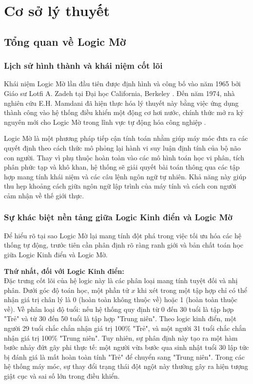 \documentclass[12pt, a4paper]{article}
\begin{document}
\section{Cơ sở lý thuyết}

\subsection{Tổng quan về Logic Mờ}
\subsubsection{Lịch sử hình thành và khái niệm cốt lõi}
Khái niệm Logic Mờ lần đầu tiên được định hình và công bố vào năm 1965 bởi Giáo sư Lotfi A. Zadeh tại Đại học California, Berkeley \cite{zadeh1965}. Đến năm 1974, nhà nghiên cứu E.H. Mamdani đã hiện thực hóa lý thuyết này bằng việc ứng dụng thành công vào hệ thống điều khiển một động cơ hơi nước, chính thức mở ra kỷ nguyên mới cho Logic Mờ trong lĩnh vực tự động hóa công nghiệp \cite{mamdani1975}.

Logic Mờ là một phương pháp tiếp cận tính toán nhằm giúp máy móc đưa ra các quyết định theo cách thức mô phỏng lại hành vi suy luận định tính của bộ não con người. Thay vì phụ thuộc hoàn toàn vào các mô hình toán học vi phân, tích phân phức tạp và khô khan, hệ thống sẽ giải quyết bài toán thông qua các tập hợp mang tính khái niệm và các câu lệnh ngôn ngữ tự nhiên. Khả năng này giúp thu hẹp khoảng cách giữa ngôn ngữ lập trình của máy tính và cách con người cảm nhận về thế giới thực.

\subsubsection{Sự khác biệt nền tảng giữa Logic Kinh điển và Logic Mờ}
Để hiểu rõ tại sao Logic Mờ lại mang tính đột phá trong việc tối ưu hóa các hệ thống tự động, trước tiên cần phân định rõ ràng ranh giới và bản chất toán học giữa Logic Kinh điển và Logic Mờ.

\textbf{Thứ nhất, đối với Logic Kinh điển:}\\
Đặc trưng cốt lõi của hệ logic này là các phân loại mang tính tuyệt đối và nhị phân. Dưới góc độ toán học, một phần tử $x$ khi xét trong một tập hợp chỉ có thể nhận giá trị chân lý là 0 (hoàn toàn không thuộc về) hoặc 1 (hoàn toàn thuộc về). Về phân loại độ tuổi: nếu hệ thống quy định từ 0 đến 30 tuổi là tập hợp "Trẻ" và từ 30 đến 50 tuổi là tập hợp "Trung niên". Theo logic kinh điển, một người 29 tuổi chắc chắn nhận giá trị 100\% "Trẻ", và một người 31 tuổi chắc chắn nhận giá trị 100\% "Trung niên". Tuy nhiên, sự phân định này tạo ra một hàm bước nhảy đứt gãy phi thực tế: một người vừa bước qua sinh nhật tuổi 30 lập tức bị đánh giá là mất hoàn toàn tính "Trẻ" để chuyển sang "Trung niên". Trong các hệ thống máy móc, sự thay đổi trạng thái đột ngột này thường gây ra hiện tượng giật cục và sai số lớn trong điều khiển.
\end{document}
